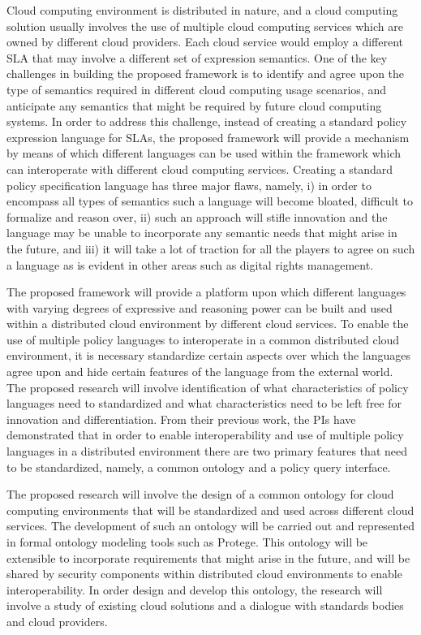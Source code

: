 \documentclass[10pt, conference, compsoc]{IEEEtran}
\begin{document}
Cloud computing environment is distributed in nature, and a cloud computing solution usually involves the use of multiple cloud computing services which are owned by different cloud providers. Each cloud service would employ a different SLA that may involve a different set of expression semantics. One of the key challenges in building the proposed framework is to identify and agree upon the type of semantics required in different cloud computing usage scenarios, and anticipate any semantics that might be required by future cloud computing systems. In order to address this challenge, instead of creating a standard policy expression language for SLAs, the proposed framework will provide a mechanism by means of which different languages can be used within the framework which can interoperate with different cloud computing services. Creating a standard policy specification language has three major flaws, namely, i)  in order to encompass all types of semantics such a language will become bloated, difficult to formalize and reason over, ii) such an approach will stifle innovation and  the language may be unable to incorporate any semantic needs that might arise in the future, and iii) it will take a lot of traction for all the players to agree on such a language as is evident in other areas such as digital rights management.

The proposed framework will provide a platform upon which different languages with varying degrees of expressive and reasoning power can be built and used within a distributed cloud environment by different cloud services.  To enable the use of multiple policy languages to interoperate in a common distributed cloud environment, it is necessary standardize certain aspects over which the languages agree upon and hide certain features of the language from the external world. The proposed research will involve identification of what characteristics of policy languages need to standardized and what characteristics need to be left free for innovation and differentiation. From their previous work, the PIs have demonstrated that in order to enable interoperability and use of multiple policy languages in a distributed environment there are two primary features that need to be standardized, namely, a common ontology and a policy query interface.

The proposed research will  involve the design of a common ontology for cloud computing environments that will be standardized and used across different cloud services. The development of such an ontology will be carried out and represented in formal ontology modeling tools such as Protege. This ontology will be extensible to incorporate requirements that might arise in the future, and will be shared by security components within distributed cloud environments to enable interoperability. In order design and develop this ontology, the research will involve a study of existing cloud solutions and a dialogue with standards bodies and cloud providers.
\end{document}

